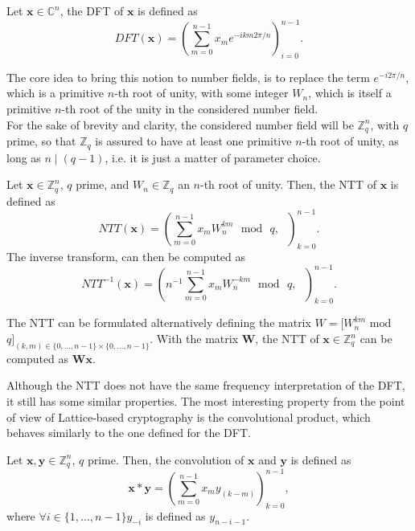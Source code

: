 \begin{definition}
Let $\mathbf{x}\in\mathbb{C}^n$, the DFT of $\mathbf{x}$ is defined as
\begin{equation*}
DFT(\mathbf{x})=\left(\sum_{m=0}^{n-1}x_me^{-ikm2\pi/n} \right)_{i=0}^{n-1}.
\end{equation*}
\end{definition}

The core idea to bring this notion to number fields, is to replace the term $e^{-i2\pi/n}$, which is a primitive $n$-th root of unity, with some integer $W_n$, which is itself a primitive $n$-th root of the unity in the considered number field.\\
For the sake of brevity and clarity, the considered number field will be $\mathbb{Z}_q^n$, with $q$ prime, so that $\mathbb{Z}_q$ is assured to have at least one primitive $n$-th root of unity, as long as $n\mid(q-1)$, i.e. it is just a matter of parameter choice.

\begin{definition}[NTT]
Let $\mathbf{x}\in\mathbb{Z}_q^n$, $q$ prime, and $W_n\in\mathbb{Z}_q$ an $n$-th root of unity. Then, the NTT of $\mathbf{x}$ is defined as
\begin{equation*}
NTT(\mathbf{x})=\left(\sum_{m=0}^{n-1}x_mW_n^{km}\text{ }\mathrm{mod}\text{ }q,\text{ }\right)_{k=0}^{n-1}.
\end{equation*}
The inverse transform, can then be computed as
\begin{equation*}
NTT^{-1}(\mathbf{x})=\left(n^{-1}\sum_{m=0}^{n-1}x_mW_n^{-km}\text{ }\mathrm{mod}\text{ }q,\text{ }\right)_{k=0}^{n-1}.
\end{equation*} 
\end{definition}

\begin{remark}
The NTT can be formulated alternatively defining the matrix $W=[W_n^{km}$ $\mathrm{mod}$ $q]_{(k,m)\in\{0,\ldots,n-1\}\times\{0,\ldots,n-1\}}$. With the matrix $\mathbf{W}$, the NTT of $\mathbf{x}\in\mathbb{Z}_q^n$ can be computed as $\mathbf{Wx}$.
\end{remark}

Although the NTT does not have the same frequency interpretation of the DFT, it still has some similar properties. The most interesting property from the point of view of Lattice-based cryptography is the convolutional product, which behaves similarly to the one defined for the DFT.

\begin{definition}
Let $\mathbf{x},\mathbf{y}\in\mathbb{Z}_q^n$, $q$ prime. Then, the convolution of $\mathbf{x}$ and $\mathbf{y}$ is defined as
\begin{equation*}
\mathbf{x}\ast\mathbf{y} = \left(\sum_{m=0}^{n-1}x_{m}y_{(k-m)}\right)_{k=0}^{n-1},
\end{equation*}
where $\forall i \in \{1,\ldots,n-1\} y_{-i}$ is defined as $y_{n-i-1}$. 
\end{definition}

